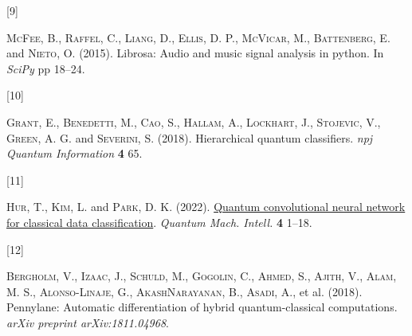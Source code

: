 \documentclass[
  13pt,
  a4paper,
  DIV=11,
  numbers=noendperiod]{scrreprt}
\newlength{\cslhangindent}
\newlength{\csllabelwidth}
\newenvironment{CSLReferences}[2] %
 {\begin{list}{}{%
  \setlength{\itemindent}{0pt}
  \setlength{\leftmargin}{0pt}
  \setlength{\parsep}{0pt}
  \ifodd #1
   \setlength{\leftmargin}{\cslhangindent}
   \setlength{\itemindent}{-1\cslhangindent}
  \fi
  \setlength{\itemsep}{#2\baselineskip}}}
 {\end{list}}
\newcommand{\CSLLeftMargin}[1]{\parbox[t]{\csllabelwidth}{\strut#1\strut}}
\newcommand{\CSLRightInline}[1]{\parbox[t]{\linewidth - \csllabelwidth}{\strut#1\strut}}
\begin{document}
\begin{CSLReferences}{0}{1}
\CSLLeftMargin{{[}9{]} }%
\CSLRightInline{\textsc{McFee}, B., \textsc{Raffel}, C., \textsc{Liang},
D., \textsc{Ellis}, D. P., \textsc{McVicar}, M., \textsc{Battenberg}, E.
and \textsc{Nieto}, O. (2015). Librosa: Audio and music signal analysis
in python. In \emph{SciPy} pp 18--24.}

\CSLLeftMargin{{[}10{]} }%
\CSLRightInline{\textsc{Grant}, E., \textsc{Benedetti}, M.,
\textsc{Cao}, S., \textsc{Hallam}, A., \textsc{Lockhart}, J.,
\textsc{Stojevic}, V., \textsc{Green}, A. G. and \textsc{Severini}, S.
(2018). Hierarchical quantum classifiers. \emph{npj Quantum Information}
\textbf{4} 65.}

\CSLLeftMargin{{[}11{]} }%
\CSLRightInline{\textsc{Hur}, T., \textsc{Kim}, L. and \textsc{Park}, D.
K. (2022). \href{https://doi.org/10.1007/s42484-021-00061-x}{{Quantum
convolutional neural network for classical data classification}}.
\emph{Quantum Mach. Intell.} \textbf{4} 1--18.}

\CSLLeftMargin{{[}12{]} }%
\CSLRightInline{\textsc{Bergholm}, V., \textsc{Izaac}, J.,
\textsc{Schuld}, M., \textsc{Gogolin}, C., \textsc{Ahmed}, S.,
\textsc{Ajith}, V., \textsc{Alam}, M. S., \textsc{Alonso-Linaje}, G.,
\textsc{AkashNarayanan}, B., \textsc{Asadi}, A., et al. (2018).
Pennylane: Automatic differentiation of hybrid quantum-classical
computations. \emph{arXiv preprint arXiv:1811.04968}.}

\end{CSLReferences}
\end{document}

